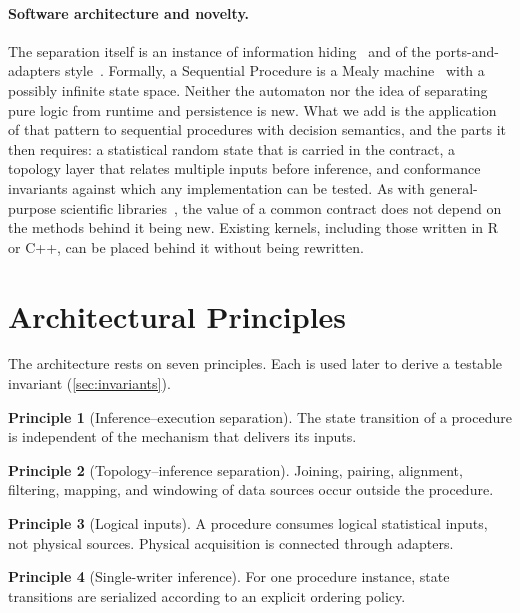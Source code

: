 \documentclass[11pt,a4paper]{article}
\theoremstyle{definition}
\newtheorem{principle}{Principle}
\theoremstyle{remark}
\begin{document}
\paragraph{Software architecture and novelty.}
The separation itself is an instance of information
hiding~\cite{parnas1972} and of the ports-and-adapters
style~\cite{cockburn2005}. Formally, a Sequential Procedure is a Mealy
machine~\cite{mealy1955} with a possibly infinite state space. Neither
the automaton nor the idea of separating pure logic from runtime and
persistence is new. What we add is the application of that pattern to
sequential procedures with decision semantics, and the parts it then
requires: a statistical random state that is carried in the contract, a
topology layer that relates multiple inputs before inference, and
conformance invariants against which any implementation can be tested.
As with general-purpose scientific libraries~\cite{virtanen2020}, the
value of a common contract does not depend on the methods behind it
being new. Existing kernels, including those written in R or C++, can be
placed behind it without being rewritten.

\section{Architectural Principles}
\label{sec:principles}

The architecture rests on seven principles. Each is used later to derive
a testable invariant (\cref{sec:invariants}).

\begin{principle}[Inference--execution separation]
\label{pr:execution}
The state transition of a procedure is independent of the mechanism that
delivers its inputs.
\end{principle}

\begin{principle}[Topology--inference separation]
\label{pr:topology}
Joining, pairing, alignment, filtering, mapping, and windowing of data
sources occur outside the procedure.
\end{principle}

\begin{principle}[Logical inputs]
\label{pr:logical}
A procedure consumes logical statistical inputs, not physical sources.
Physical acquisition is connected through adapters.
\end{principle}

\begin{principle}[Single-writer inference]
\label{pr:single-writer}
For one procedure instance, state transitions are serialized according
to an explicit ordering policy.
\end{principle}
\end{document}
